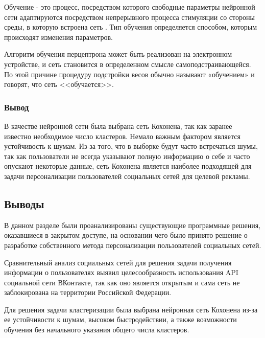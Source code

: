 Обучение - это процесс, посредством которого свободные параметры нейронной сети адаптируются посредством непрерывного процесса стимуляции со стороны среды, в которую встроена сеть \cite{ettaouil2013architecture}. Тип обучения определяется способом, которым происходят изменения параметров. 

Алгоритм обучения перцептрона может быть реализован на электронном устройстве, и сеть становится в определенном смысле самоподстраивающейся. По этой причине процедуру подстройки весов обычно называют «обучением» и говорят, что сеть <<обучается>>. 

\subsubsection{Вывод}
В качестве нейронной сети была выбрана сеть Кохонена, так как заранее известно необходимое число кластеров. Немало важным фактором является устойчивость к шумам. Из-за того, что в выборке будут часто встречаться шумы, так как пользователи не всегда указывают полную информацию о себе и часто опускают некоторые данные, сеть Кохонена является наиболее подходящей для задачи персонализации пользователей социальных сетей для целевой рекламы.

\subsection{Выводы}
В данном разделе были проанализированы существующие программные решения, оказавшиеся в закрытом доступе, на основании чего было принято решение о разработке собственного метода персонализации пользователей социальных сетей.

Сравнительный анализ социальных сетей для решения задачи получения информации о пользователях выявил целесообразность использования API социальной сети ВКонтакте, так как оно является открытым и сама сеть не заблокирована на территории Российской Федерации.

Для решения задачи кластеризации была выбрана нейронная сеть Кохонена из-за ее устойчивости к шумам, высоком быстродействии, а также возможности обучения без начального указания общего числа кластеров.


\pagebreak